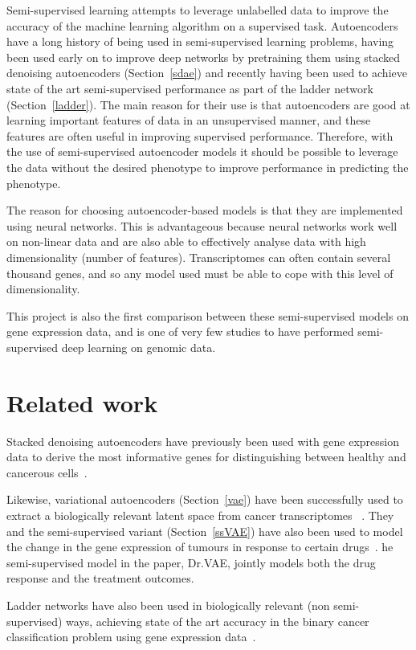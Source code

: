Semi-supervised learning attempts to leverage unlabelled data to improve the accuracy of the machine learning
algorithm on a supervised task. Autoencoders have a long history of being used in semi-supervised learning problems,
having been used early on to improve deep networks by pretraining them using stacked denoising autoencoders (Section~\ref{sdae})
and recently having been used to achieve state of the art semi-supervised performance as part of the ladder 
network (Section~\ref{ladder}). The main reason for their use is that autoencoders are good at learning 
important features of data in an unsupervised manner, and these features are often useful in improving 
supervised performance. Therefore, with the use of semi-supervised autoencoder models it should be possible to leverage the data without
the desired phenotype to improve performance in predicting the phenotype.

The reason for choosing autoencoder-based models is that they are implemented
using neural networks. This is advantageous because neural networks work well on non-linear data and are
also able to effectively analyse data with high dimensionality (number of features). Transcriptomes can
often contain several thousand genes, and so any model used must be able to cope with this level of dimensionality.

This project is also the first comparison between these semi-supervised models on gene expression data, and is one of very few
studies to have performed semi-supervised deep learning on genomic data.

\section{Related work}

Stacked denoising autoencoders have previously been used with gene expression data to derive the most informative
genes for distinguishing between healthy and cancerous cells~\cite{8217828}.

Likewise, variational autoencoders (Section~\ref{vae}) have been successfully used to extract a biologically relevant latent 
space from cancer transcriptomes ~\cite{Way2018ExtractingAB}. They and the semi-supervised variant (Section~\ref{ssVAE}) 
have also been used to model the change in the gene expression of tumours in response to certain drugs~\cite{10.1093/bioinformatics/btz158}.
he semi-supervised model in the paper, Dr.VAE, jointly models both the drug response and the treatment outcomes.

Ladder networks have also been used in biologically relevant (non semi-supervised)
ways, achieving state of the art accuracy in the binary cancer classification
problem using gene expression data~\cite{10.1007/978-3-319-78723-7_23}.